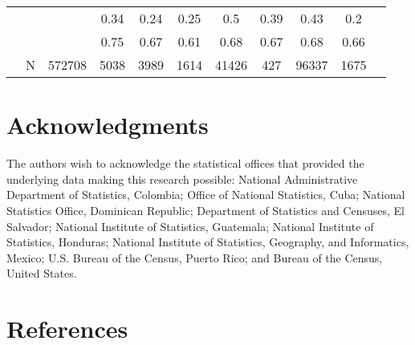 \documentclass[
]{article}
\begin{document}
\begin{landscape}
\begin{table}[ht]
\begin{tabular}{l>{\raggedright\arraybackslash}p{3.2cm}|ccccccccc}
   & \multicolumn{1}{>{\raggedleft\arraybackslash}p{2.9cm}|}{\makebox[2.9cm][r]{Lives with Child }} &  & 0.34 & 0.24 & 0.25 & 0.5 & 0.39 & 0.43 & 0.2 \\ 
   & \multicolumn{1}{>{\raggedleft\arraybackslash}p{3.4cm}|}{\makebox[3.4cm][r]{Married/Cohabiting }} &  & 0.75 & 0.67 & 0.61 & 0.68 & 0.67 & 0.68 & 0.66 \\ 
   & N & 572708 & 5038 & 3989 & 1614 & 41426 & 427 & 96337 & 1675 \\ 
   \hline
\end{tabular}
\endgroup
\end{table}
\end{landscape}

\newpage
\section*{Acknowledgments}

The authors wish to acknowledge the statistical offices that provided
the underlying data making this research possible: National
Administrative Department of Statistics, Colombia; Office of National
Statistics, Cuba; National Statistics Office, Dominican Republic;
Department of Statistics and Censuses, El Salvador; National Institute
of Statistics, Guatemala; National Institute of Statistics, Honduras;
National Institute of Statistics, Geography, and Informatics, Mexico;
U.S. Bureau of the Census, Puerto Rico; and Bureau of the Census, United
States.

\newpage

\newpage

\section*{References}\label{references}
\end{document}
